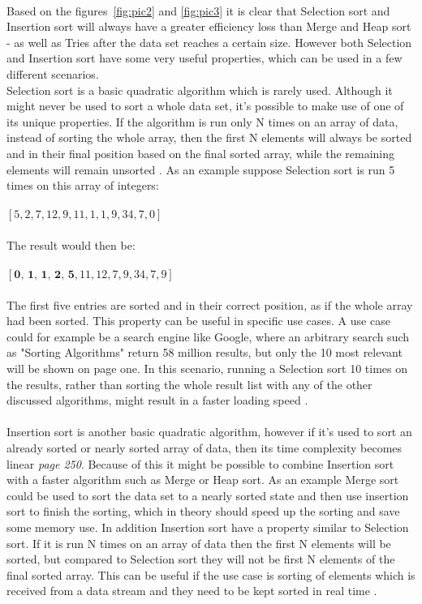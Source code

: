 \\
Based on the figures~\ref{fig:pic2} and \ref{fig:pic3} it is clear that Selection sort and Insertion sort will always have a greater efficiency loss than Merge and Heap sort - as well as Tries after the data set reaches a certain size. However both Selection and Insertion sort have some very useful properties, which can be used in a few different scenarios.
\\
Selection sort is a basic quadratic algorithm which is rarely used. Although it might never be used to sort a whole data set, it's possible to make use of one of its unique properties. If the algorithm is run only N times on an array of data, instead of sorting the whole array, then the first N elements will always be sorted and in their final position based on the final sorted array, while the remaining elements will remain unsorted \cite{sortingAlgo}. As an example suppose Selection sort is run 5 times on this array of integers:\\
\\
\([5, 2, 7, 12, 9, 11, 1, 1, 9, 34, 7, 0]\)\\
\\
The result would then be:\\
\\
\([\textbf{0, 1, 1, 2, 5}, 11, 12, 7, 9, 34, 7, 9]\)\\
\\
The first five entries are sorted and in their correct position, as if the whole array had been sorted.
This property can be useful in specific use cases. A use case could for example be a search engine like Google, where an arbitrary search such as "Sorting Algorithms" return 58 million results, but only the 10 most relevant will be shown on page one. 
In this scenario, running a Selection sort 10 times on the results, rather than sorting the whole result list with any of the other discussed algorithms, might result in a faster loading speed \cite{sortingAlgo}.
\\
\\
Insertion sort is another basic quadratic algorithm, however if it's used to sort an already sorted or nearly sorted array of data, then its time complexity becomes linear \cite{algo} \emph{page 250}. Because of this it might be possible to combine Insertion sort with a faster algorithm such as Merge or Heap sort. As an example Merge sort could be used to sort the data set to a nearly sorted state and then use insertion sort to finish the sorting, which in theory should speed up the sorting and save some memory use. In addition Insertion sort have a property similar to Selection sort. If it is run N times on an array of data then the first N elements will be sorted, but compared to Selection sort they will not be first N elements of the final sorted array. This can be useful if the use case is sorting of elements which is received from a data stream and they need to be kept sorted in real time \cite{sortingAlgo}.


